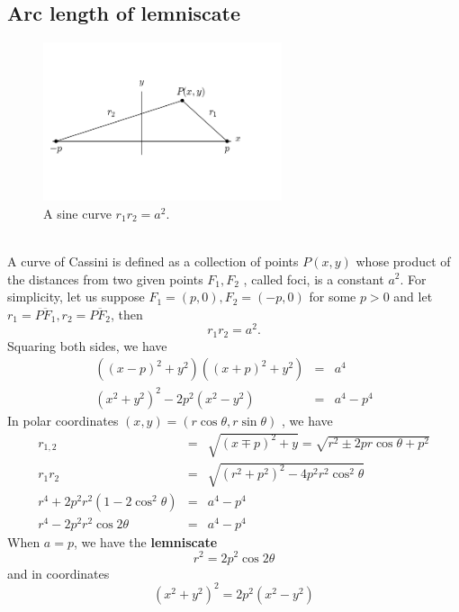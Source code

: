 \documentclass{article}
\begin{document}
\subsection{Arc length of lemniscate}
\label{sec-2-5}
\begin{figure}[htb]
\centering
\includegraphics[width=70mm]{./cassini_generic_point.png}
\caption{\label{fig:generic_cassini}A sine curve $r_{1} r_{2} = a^{2}$.}
\end{figure} \\
A curve of Cassini is defined as a collection of points $P(x,y)$ whose product of the distances from two given points $F_1, F_2$ , called foci, is a constant $a^2$. For simplicity, let us suppose $F_1 = (p,0), F_2 = (-p, 0)$ for some $p>0$ and let $r_1 = \overline{PF_1}, r_2 = \overline{PF_2}$, then
\begin{equation}
r_1 r_2 = a^2.
\end{equation}
Squaring both sides, we have
\begin{eqnarray}
((x - p)^{2} + y^{2})((x + p)^{2} + y^{2}) & = &  a^{4} \\ \nonumber
(x^{2} + y^{2})^{2} -2p^{2} (x^{2} -y^{2}) & = & a^{4} - p^{4}
\end{eqnarray}
In polar coordinates $(x, y) = (r\cos{\theta}, r\sin{\theta})$ , we have
\begin{eqnarray}
r_{1,2} &=&  \sqrt{(x \mp p)^{2} +y} = \sqrt{r^{2} \pm 2pr \cos{\theta} + p^{2}} \\ \nonumber
r_{1} r_{2} &=&  \sqrt{(r^{2}  + p^{2})^{2} - 4p^{2}r^{2} \cos^{2}{\theta}} \\ \nonumber
r^{4} + 2p^{2}r^{2} ( 1 - 2 \cos^{2}{\theta}) &=& a^{4} - p^{4} \\ \nonumber
r^{4} - 2p^{2}r^{2}  \cos{2\theta} &=& a^{4} - p^{4} 
\end{eqnarray}
When $a=p$, we have the \textbf{lemniscate}
\begin{equation}
r^{2} = 2p^{2} \cos{2\theta} 
\end{equation}
and in coordinates
\begin{equation}
(x^{2} + y^{2})^{2} = 2p^{2} (x^{2} -y^{2})
\end{equation}
\end{document}
